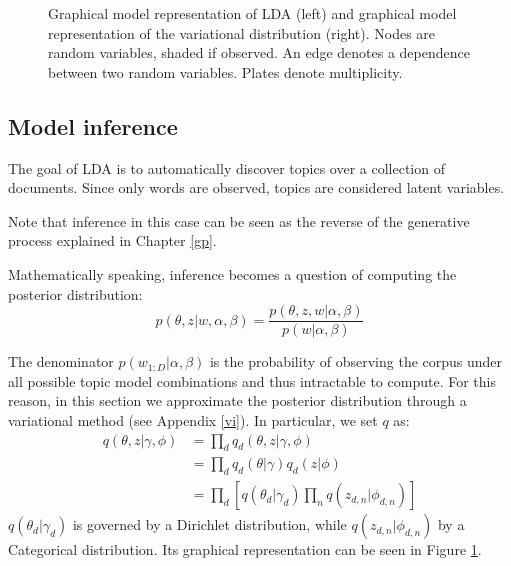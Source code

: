 \begin{figure}[h]
    \centering
    \caption{Graphical model representation of LDA (left) and graphical model representation of the variational distribution (right). Nodes are random variables, shaded if observed. An edge denotes a dependence between two random variables. Plates denote multiplicity.}
    \label{fig:lda}
\end{figure}

\subsection{Model inference} \label{modelinference}
The goal of LDA is to automatically discover topics over a collection of documents.
Since only words are observed, topics are considered latent variables.

Note that inference in this case can be seen as the reverse of the generative process explained in Chapter \ref{gp}.

Mathematically speaking, inference becomes a question of computing the posterior distribution:
\[ p(\theta, z | w, \alpha, \beta) = \frac{p(\theta, z, w | \alpha, \beta)}{p(w| \alpha, \beta)} \]

The denominator $p(w_{1:D} | \alpha, \beta)$ is the probability of observing the corpus under all possible topic model combinations
and thus intractable to compute.
For this reason, in this section we approximate the posterior distribution through a variational method
(see Appendix \ref{vi}).
In particular, we set $q$ as:
\begin{equation*}
    \begin{split}
        q(\theta, z | \gamma, \phi) & = \prod_d q_d(\theta, z | \gamma, \phi) \\
        & = \prod_d q_d(\theta | \gamma) q_d(z | \phi) \\
        & = \prod_d [q(\theta_d | \gamma_d) \prod_n q(z_{d,n} | \phi_{d,n})]
    \end{split}
\end{equation*}
$q(\theta_d | \gamma_d)$ is governed by a Dirichlet distribution, while $q(z_{d,n} | \phi_{d,n})$ by a Categorical distribution.
Its graphical representation can be seen in Figure \ref{fig:lda}.

